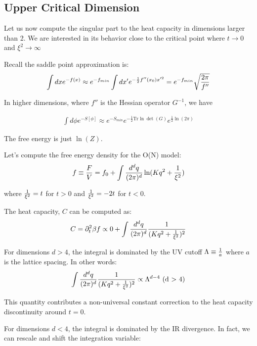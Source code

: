 \documentclass[11pt]{scrartcl}
\begin{document}
\subsection{Upper Critical Dimension}

Let us now compute the singular part to the heat capacity in dimensions larger than 2.  We are interested in its behavior close to the critical point where $t \rightarrow 0$ and $\xi^2 \rightarrow \infty$

Recall the saddle point approximation is:
\begin{align}
\int dx e^{-f(x)} \approx e^{-f_{min}} \int dx' e^{- \frac12 f''(x_0) x'^2} = e^{- f_{min}} \sqrt{2 \pi \over f''}
\end{align}

In higher dimensions, where $f''$ is the Hessian operator $G^{-1}$, we have

\begin{align}
\int d\phi e^{-S[\phi]} \approx e^{- S_{min}} e^{-\frac12 \text{Tr} \ln \det(G)} e^{\frac12 \ln(2 \pi) }
\end{align}

The free energy is just $\ln(Z)$. 

Let's compute the free energy density for the O(N) model:
\begin{align}
f \equiv {F \over V} = f_0 + \int {d^d q \over (2 \pi)^d} \ln(Kq^2 + {1 \over \xi^2})
\end{align}

where ${1 \over \xi^2} = t$ for $t > 0$ and ${1 \over \xi^2} = -2t$ for $ t< 0$.

The heat capacity, $C$ can be computed as:
\begin{align}
C = \partial_{t}^2 {\beta f} \propto 0 + \int {d^d q \over (2 \pi)^d} {1 \over (K q^2 + {1 \over \xi^2})^2}
\end{align}

For dimensions $ d> 4$, the integral is dominated by the UV cutoff $\Lambda \equiv {1 \over a}$ where $a$ is the lattice spacing.  In other words:
\begin{align}
\int { d^d q \over (2 \pi)^d} {1 \over (K q^2 + {1 \over \xi^2})^2} \propto \Lambda^{d-4} \text{ (d $>$ 4)}
\end{align}

This quantity contributes a non-universal constant correction to the heat capacity discontinuity around $t = 0$.

For dimensions $d < 4$, the integral is dominated by the IR divergence.  In fact, we can rescale and 
shift the integration variable:
\end{document}

